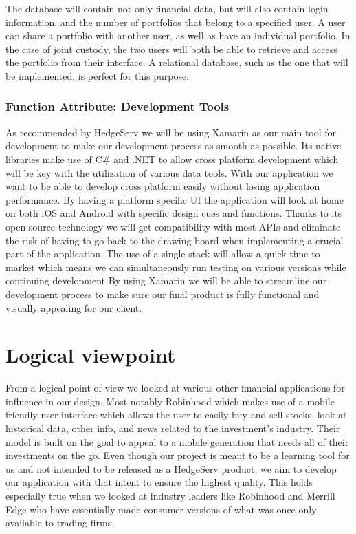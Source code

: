 \documentclass[onecolumn, draftclsnofoot,10pt, compsoc]{IEEEtran}
\begin{document}
        The database will contain not only financial data, but will also contain login information, and the number of portfolios that belong to a specified user. A user can share a portfolio
        with another user, as well as have an individual portfolio. In the case of joint custody, the two users will both be able to retrieve and access the portfolio from their interface.
        A relational database, such as the one that will be implemented, is perfect for this purpose.

\subsubsection{Function Attribute: Development Tools}
    As recommended by HedgeServ we will be using Xamarin as our main tool for development to make our development process as smooth as possible. Its native libraries make use of C\# and .NET to allow cross platform development which will be key with the utilization of various data tools. With our application we want to be able to develop cross platform easily without losing application performance. By having a platform specific UI the application will look at home on both iOS and Android with specific design cues and functions. Thanks to its open source technology we will get compatibility with most APIs and eliminate the risk of having to go back to the drawing board when implementing a crucial part of the application. The use of a single stack will allow a quick time to market which means we can simultaneously run testing on various versions while continuing development By using Xamarin we will be able to streamline our development process to make sure our final product is fully functional and visually appealing for our client. 


\section{Logical viewpoint}
        From a logical point of view we looked at various other financial applications for influence in our design. Most notably Robinhood which makes use of a mobile friendly user interface which allows the user to easily buy and sell stocks, look at historical data, other info, and news related to the investment's industry. Their model is built on the goal to appeal to a mobile generation that needs all of their investments on the go. Even though our project is meant to be a learning tool for us and not intended to be released as a HedgeServ product, we aim to develop our application with that intent to ensure the highest quality. This holds especially true when we looked at industry leaders like Robinhood and Merrill Edge who have essentially made consumer versions of what was once only available to trading firms. 
     
\end{document}
